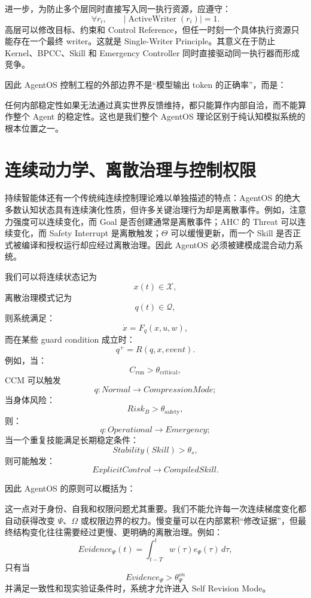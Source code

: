 进一步，为防止多个层同时直接写入同一执行资源，应遵守：
\[
\boxed{
\forall r_i,\qquad
|\operatorname{ActiveWriter}(r_i)|=1.
}
\]
高层可以修改目标、约束和 Control Reference，但任一时刻一个具体执行资源只能存在一个最终 writer。这就是 Single-Writer Principle。其意义在于防止 Kernel、BPCC、Skill 和 Emergency Controller 同时直接驱动同一执行器而形成竞争。

因此 AgentOS 控制工程的外部边界不是“模型输出 token 的正确率”，而是：
\begin{statementbox}
\centering
{}
\end{statementbox}
任何内部稳定性如果无法通过真实世界反馈维持，都只能算作内部自洽，而不能算作整个 Agent 的稳定性。这也是我们整个 AgentOS 理论区别于纯认知模拟系统的根本位置之一。

\section{连续动力学、离散治理与控制权限}

持续智能体还有一个传统纯连续控制理论难以单独描述的特点：AgentOS 的绝大多数认知状态具有连续演化性质，但许多关键治理行为却是离散事件。例如，注意力强度可以连续变化，而 Goal 是否创建通常是离散事件；AHC 的 Threat 可以连续变化，而 Safety Interrupt 是离散触发；$\Theta$ 可以缓慢更新，而一个 Skill 是否正式被编译和授权运行却应经过离散治理。因此 AgentOS 必须被建模成混合动力系统。

我们可以将连续状态记为
\[
x(t)\in\mathcal X,
\]
离散治理模式记为
\[
q(t)\in\mathcal Q,
\]
则系统满足：
\[
\dot x
=
F_q(x,u,w),
\]
而在某些 guard condition 成立时：
\[
q^+
=
R(q,x,event).
\]
例如，当：
\[
C_{\mathrm{run}}
>
\theta_{\mathrm{critical}},
\]
CCM 可以触发
\[
q:
Normal
\rightarrow
CompressionMode;
\]
当身体风险：
\[
Risk_B>\theta_{\mathrm{safety}},
\]
则：
\[
q:
Operational
\rightarrow
Emergency;
\]
当一个重复技能满足长期稳定条件：
\[
Stability(Skill)>\theta_s,
\]
则可能触发：
\[
ExplicitControl
\rightarrow
CompiledSkill.
\]

因此 AgentOS 的原则可以概括为：
\begin{statementbox}
\centering
{}
\end{statementbox}
这一点对于身份、自我和权限问题尤其重要。我们不能允许每一次连续梯度变化都自动获得改变 $\Psi$、$\Omega$ 或权限边界的权力。慢变量可以在内部累积“修改证据”，但最终结构变化往往需要经过更慢、更明确的离散治理。例如：
\[
Evidence_\Psi(t)
=
\int_{t-T}^{t}
w(\tau)e_\Psi(\tau)\,d\tau,
\]
只有当
\[
Evidence_\Psi>\theta_{\Psi}^{on}
\]
并满足一致性和现实验证条件时，系统才允许进入 Self Revision Mode。

